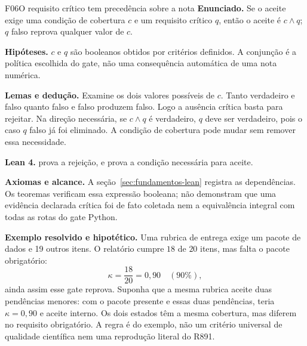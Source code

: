 \begin{formalizacao}{F06}{O requisito crítico tem precedência sobre a nota}
\textbf{Enunciado.} Se o aceite exige uma condição de cobertura $c$ e um requisito crítico $q$, então o aceite é $c\land q$; $q$ falso reprova qualquer valor de $c$.

\textbf{Hipóteses.} $c$ e $q$ são booleanos obtidos por critérios definidos. A conjunção é a política escolhida do gate, não uma consequência automática de uma nota numérica.

\textbf{Lemas e dedução.} Examine os dois valores possíveis de $c$. Tanto verdadeiro e falso quanto falso e falso produzem falso. Logo a ausência crítica basta para rejeitar. Na direção necessária, se $c\land q$ é verdadeiro, $q$ deve ser verdadeiro, pois o caso $q$ falso já foi eliminado. A condição de cobertura pode mudar sem remover essa necessidade.

\textbf{Lean 4.}  prova a rejeição, e  prova a condição necessária para aceite.

\textbf{Axiomas e alcance.} A seção~\ref{sec:fundamentos-lean} registra as dependências. Os teoremas verificam essa expressão booleana; não demonstram que uma evidência declarada crítica foi de fato coletada nem a equivalência integral com todas as rotas do gate Python.
\end{formalizacao}

\begin{resultado}
\textbf{Exemplo resolvido e hipotético.} Uma rubrica de entrega exige um
pacote de dados e 19 outros itens. O relatório cumpre $18$ de $20$ itens,
mas falta o pacote obrigatório:
\[ \kappa = \frac{18}{20} = 0{,}90 \quad (90\%), \]
ainda assim esse gate reprova. Suponha que a mesma rubrica aceite duas
pendências menores: com o pacote presente e essas duas pendências, teria
$\kappa=0{,}90$ e aceite interno. Os dois estados têm a mesma cobertura,
mas diferem no requisito obrigatório. A regra é do exemplo, não um critério
universal de qualidade científica nem uma reprodução literal do R891.
\end{resultado}

